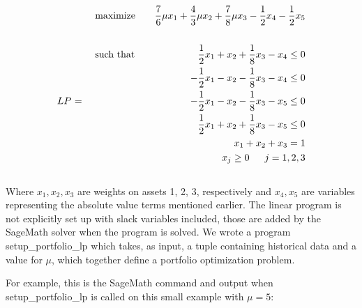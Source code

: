 \documentclass{article}
\begin{document}
\begin{align*}
&\text {} &&\text{maximize}  &&&\text{$\frac{7}{6}\mu x_1 + \frac{4}{3}\mu x_2 + \frac{7}{8}\mu x_3 - \frac{1}{2} x_4 - \frac{1}{2}x_5$}\\
\\
&\text{}&&\text{such that}  &&&\text{$\frac{1}{2}x_1 + x_2 +  \frac{1}{8}x_3 - x_4 \leq 0$}\\
&\text{}&&\text{}  &&&\text{$-\frac{1}{2}x_1 - x_2 -  \frac{1}{8}x_3 - x_4 \leq 0$}\\
&\text{$LP $ = }&&\text{}  &&&\text{$-\frac{1}{2}x_1 - x_2 -  \frac{1}{8}x_3 - x_5 \leq 0$}\\
&\text{}&&\text{}  &&&\text{$\frac{1}{2}x_1 + x_2 +  \frac{1}{8}x_3 - x_5 \leq 0$}\\
&\text{}&&\text{}  &&&\text{$x_1 + x_2 + x_3 = 1$}\\
&\text{}&&\text{}  &&&\text{$x_j \geq 0$ \hspace{9pt} $j = 1,2,3$}
\end{align*}
\\

Where $x_1, x_2, x_3$ are weights on assets 1, 2, 3, respectively and $x_4, x_5$ are variables representing the absolute value terms mentioned earlier. The linear program is not explicitly set up with slack variables included, those are added by the SageMath solver when the program is solved. We wrote a program {\selectfont setup\_portfolio\_lp} which takes, as input, a tuple containing historical data and a value for $\mu$, which together define a portfolio optimization problem.

For example, this is the SageMath command and output when\\ {\selectfont setup\_portfolio\_lp} is called on this small example with $\mu = 5$:
\end{document}

